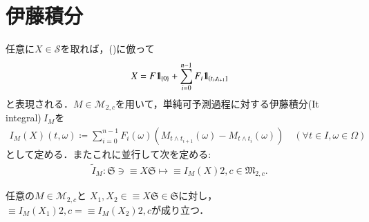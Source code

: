 \section{伊藤積分}
	
	\begin{screen}
		\begin{dfn}[単純可予測過程に対する伊藤積分]
			任意に$X \in \mathcal{S}$を取れば，()に倣って
			\begin{align}
				X = F \mbox{1}\hspace{-0.25em}\mbox{l}_{\{0\}} + \sum_{i=0}^{n-1} F_i \mbox{1}\hspace{-0.25em}\mbox{l}_{\left(t_i,t_{i+1}\right]}
				\label{eq:dfn_Ito_integral_simple_predictable_process}
			\end{align}
			と表現される．$M \in \mathcal{M}_{2,c}$を用いて，単純可予測過程に対する伊藤積分(It integral)$\ I_M$を
			\begin{align}
				I_M(X)(t,\omega) \coloneqq \sum_{i=0}^{n-1} F_i(\omega) \left(M_{t \wedge t_{i+1}}(\omega) - M_{t \wedge t_i}(\omega)\right)
				\quad (\forall t \in I,\omega \in \Omega)
			\end{align}
			として定める．またこれに並行して次を定める:
			\begin{align}
				\tilde{I}_M:\mathfrak{S} \ni \equiv{X}{\mathfrak{S}} \longmapsto \equiv{I_M(X)}{2,c} \in \mathfrak{M}_{2,c}.
			\end{align}
			\label{dfn:Ito_integral_simple_predictable_process}
		\end{dfn}
	\end{screen}
	
	\begin{screen}
		\begin{lem}
			任意の$M \in \mathcal{M}_{2,c}$と
			$X_1,X_2 \in \equiv{X}{\mathfrak{S}} \in \mathfrak{S}$に対し，
			$\equiv{I_M(X_1)}{2,c} = \equiv{I_M(X_2)}{2,c}$が成り立つ．
		\end{lem}
	\end{screen}
	
